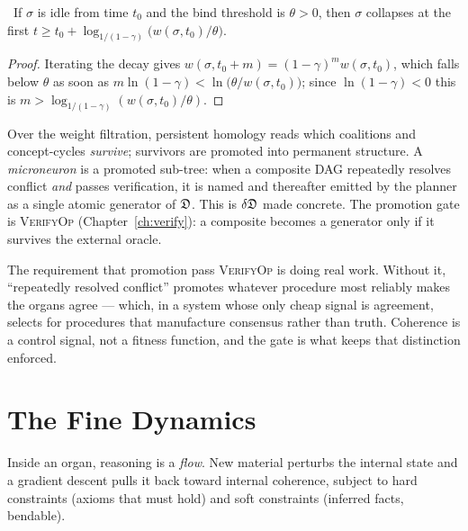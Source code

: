 \begin{proposition}\label{prop:decay}
\Proved\ If $\sigma$ is idle from time $t_0$ and the bind threshold is
$\theta>0$, then $\sigma$ collapses at the first
$t\ge t_0+\log_{1/(1-\gamma)}\bigl(w(\sigma,t_0)/\theta\bigr)$.
\end{proposition}
\begin{proof}
Iterating the decay gives $w(\sigma,t_0+m)=(1-\gamma)^mw(\sigma,t_0)$,
which falls below $\theta$ as soon as
$m\ln(1-\gamma)<\ln\bigl(\theta/w(\sigma,t_0)\bigr)$; since
$\ln(1-\gamma)<0$ this is $m>\log_{1/(1-\gamma)}(w(\sigma,t_0)/\theta)$.
\end{proof}

\begin{construction}\label{con:micro}
Over the weight filtration, persistent homology reads which coalitions
and concept-cycles \emph{survive}; survivors are promoted into permanent
structure. A \emph{microneuron} is a promoted sub-tree: when a composite
DAG repeatedly resolves conflict \emph{and} passes verification, it is
named and thereafter emitted by the planner as a single atomic generator
of $\mathfrak{D}$. This is $\delta\mathfrak{D}$ made concrete. The promotion gate is
\textsc{VerifyOp} (Chapter~\ref{ch:verify}): a composite becomes a
generator only if it survives the external oracle.
\end{construction}

\begin{hon}\Hon
The requirement that promotion pass \textsc{VerifyOp} is doing real
work. Without it, ``repeatedly resolved conflict'' promotes whatever
procedure most reliably makes the organs agree --- which, in a system
whose only cheap signal is agreement, selects for procedures that
manufacture consensus rather than truth. Coherence is a control signal,
not a fitness function, and the gate is what keeps that distinction
enforced.
\end{hon}

\chapter{The Fine Dynamics}\label{ch:flow}

\begin{intu}\Intu
Inside an organ, reasoning is a \emph{flow}. New material perturbs the
internal state and a gradient descent pulls it back toward internal
coherence, subject to hard constraints (axioms that must hold) and soft
constraints (inferred facts, bendable).
\end{intu}


